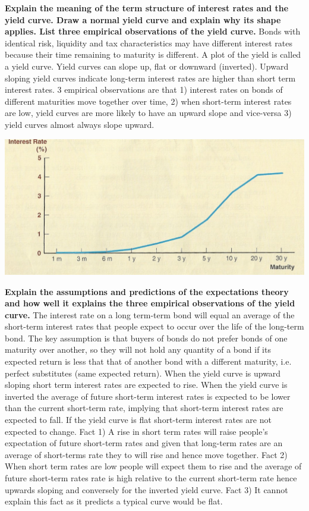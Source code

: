 \documentclass[12pt]{examnotes}
\begin{document}
\textbf{Explain the meaning of the term structure of interest rates and the yield curve. Draw a normal yield curve and explain why its shape applies. List three empirical observations of the yield curve.}
Bonds with identical risk, liquidity and tax characteristics may have different interest rates because their time remaining to maturity is different. A plot of the yield is called a yield curve. Yield curves can slope up, flat or downward (inverted). Upward sloping yield curves indicate long-term interest rates are higher than short term interest rates. 3 empirical observations are that 1) interest rates on bonds of different maturities move together over time, 2) when short-term interest rates are low, yield curves are more likely to have an upward slope and vice-versa 3) yield curves almost always slope upward. 
\begin{center}
  \includegraphics[scale=0.4]{./imgs/yieldcurve.jpg}
\end{center}

\textbf{Explain the assumptions and predictions of the expectations theory and how well it explains the three empirical observations of the yield curve.}
The interest rate on a long term-term bond will equal an average of the short-term interest rates that people expect to occur over the life of the long-term bond. The key assumption is that buyers of bonds do not prefer bonds of one maturity over another, so they will not hold any quantity of a bond if its expected return is less that that of another bond with a different maturity, i.e. perfect substitutes (same expected return). When the yield curve is upward sloping short term interest rates are expected to rise. When the yield curve is inverted the average of future short-term interest rates is expected to be lower than the current short-term rate, implying that short-term interest rates are expected to fall. If the yield curve is flat short-term interest rates are not expected to change. Fact 1) A rise in short term rates will raise people's expectation of future short-term rates and given that long-term rates are an average of short-terms rate they to will rise and hence move together. Fact 2) When short term rates are low people will expect them to rise and the average of future short-term rates rate is high relative to the current short-term rate hence upwards sloping and conversely for the inverted yield curve. Fact 3) It cannot explain this fact as it predicts a typical curve would be flat. 
\end{document}
